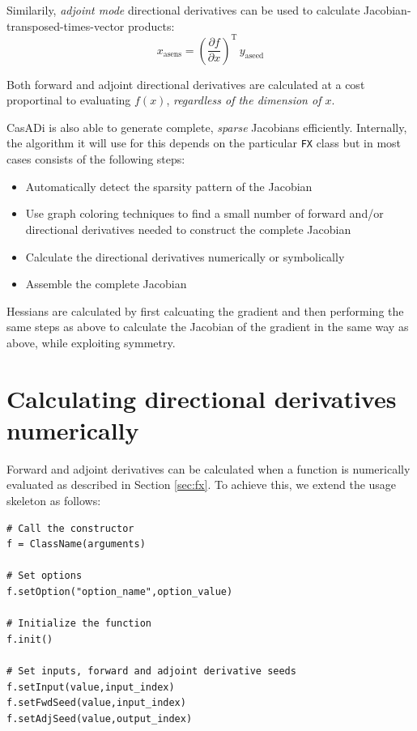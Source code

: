 \documentclass[a4paper,12pt]{book}
\begin{document}
{Similarily, \emph{adjoint mode} directional derivatives can be used to calculate Jacobian-transposed-times-vector products:
\begin{equation}
 x_{\text{asens}} = \left(\frac{\partial f}{\partial x}\right)^{\text{T}} \, y_{\text{aseed}}
\end{equation}

Both forward and adjoint directional derivatives are calculated at a cost proportinal to evaluating $f(x)$, \emph{regardless of the dimension of $x$}.

CasADi is also able to generate complete, \emph{sparse} Jacobians efficiently. Internally, the algorithm it will use for this depends on the particular \texttt{FX} class but in most cases consists of the following steps:
\begin{itemize}
 \item Automatically detect the sparsity pattern of the Jacobian
 \item Use graph coloring techniques to find a small number of forward and/or directional derivatives needed to construct the complete Jacobian
 \item Calculate the directional derivatives numerically or symbolically
 \item Assemble the complete Jacobian
\end{itemize}

Hessians are calculated by first calcuating the gradient and then performing the same steps as above to calculate the Jacobian of the gradient in the same way as above, while exploiting symmetry.

\section{Calculating directional derivatives numerically} \label{sec:ad_numeric}
Forward and adjoint derivatives can be calculated when a function is numerically evaluated as described in Section \ref{sec:fx}. To achieve this, we extend the usage skeleton as follows:

\begin{verbatim}
# Call the constructor
f = ClassName(arguments)

# Set options
f.setOption("option_name",option_value)

# Initialize the function
f.init()

# Set inputs, forward and adjoint derivative seeds
f.setInput(value,input_index)
f.setFwdSeed(value,input_index)
f.setAdjSeed(value,output_index)


\end{verbatim}}
\end{document}
